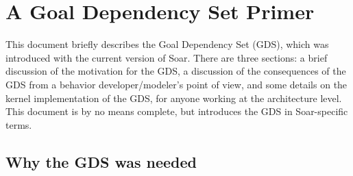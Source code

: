 \chapter[A Goal Dependency Set Primer]{
A Goal Dependency Set Primer}

\label{GDS}




%


      






This document briefly describes the Goal Dependency Set (GDS), which
was introduced with the current version of Soar.  There are three sections: a brief
discussion of the motivation for the GDS, a discussion of the
consequences of the GDS from a behavior developer/modeler's point of
view, and some details on the kernel implementation of the GDS, for
anyone working at the architecture level.  This document is by no
means complete, but introduces the GDS in Soar-specific terms.

\section*{Why the GDS was needed}

